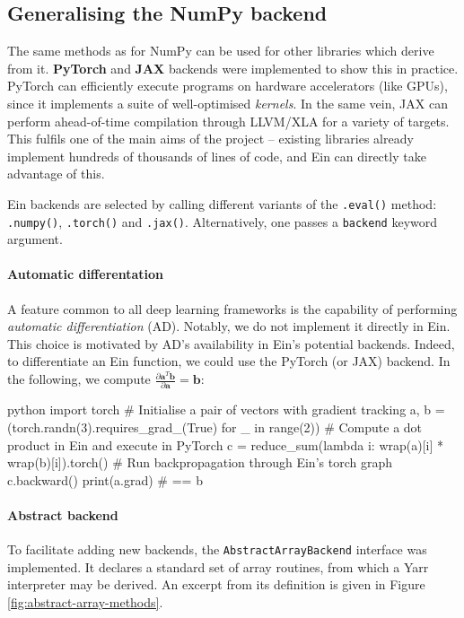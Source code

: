 \subsection{Generalising the NumPy backend}

The same methods as for NumPy can be used for other libraries which derive from it. \textbf{PyTorch} and \textbf{JAX} backends were implemented to show this in practice. PyTorch can efficiently execute programs on hardware accelerators (like GPUs), since it implements a suite of well-optimised \textit{kernels}. In the same vein, JAX can perform ahead-of-time compilation through LLVM/XLA for a variety of targets. This fulfils one of the main aims of the project -- existing libraries already implement hundreds of thousands of lines of code, and Ein can directly take advantage of this.

Ein backends are selected by calling different variants of the \texttt{.eval()} method: \texttt{.numpy()}, \texttt{.torch()} and \texttt{.jax()}. Alternatively, one passes a \texttt{backend} keyword argument.

\paragraph{Automatic differentation} A feature common to all deep learning frameworks is the capability of performing \textit{automatic differentiation} (AD). Notably, we do not implement it directly in Ein. This choice is motivated by AD's availability in Ein's potential backends. Indeed, to differentiate an Ein function, we could use the PyTorch (or JAX) backend. In the following, we compute $\frac{\partial \mathbf{a}^T \mathbf{b}}{\partial \mathbf{a}} = \mathbf{b}$:
\begin{center}
\begin{cminted}{python}
import torch
# Initialise a pair of vectors with gradient tracking
a, b = (torch.randn(3).requires_grad_(True) for _ in range(2))
# Compute a dot product in Ein and execute in PyTorch
c = reduce_sum(lambda i: wrap(a)[i] * wrap(b)[i]).torch()
# Run backpropagation through Ein's torch graph
c.backward()
print(a.grad)  # == b
\end{cminted}
\end{center}

\paragraph{Abstract backend} To facilitate adding new backends, the \texttt{AbstractArrayBackend} interface was implemented. It declares a standard set of array routines, from which a Yarr interpreter may be derived. An excerpt from its definition is given in Figure \ref{fig:abstract-array-methods}.

